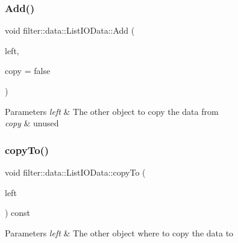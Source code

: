 \subsubsection{\texorpdfstring{Add()}{Add()}}
{\footnotesize\ttfamily void filter\+::data\+::\+List\+I\+O\+Data\+::\+Add (\begin{DoxyParamCaption}\item[{const \hyperlink{classfilter_1_1data_1_1_list_i_o_data}{List\+I\+O\+Data} \&}]{left,  }\item[{bool}]{copy = {\ttfamily false} }\end{DoxyParamCaption})\hspace{0.3cm}{\ttfamily [inline]}}


\begin{DoxyParams}{Parameters}
{\em left} & The other object to copy the data from \\
\hline
{\em copy} & unused \\
\hline
\end{DoxyParams}
\mbox{\label{classfilter_1_1data_1_1_list_i_o_data_a1e56236e33f0389b74ad287a209e0829}} 
\subsubsection{\texorpdfstring{copy\+To()}{copyTo()}}
{\footnotesize\ttfamily void filter\+::data\+::\+List\+I\+O\+Data\+::copy\+To (\begin{DoxyParamCaption}\item[{\hyperlink{classfilter_1_1data_1_1_list_i_o_data}{List\+I\+O\+Data} \&}]{left }\end{DoxyParamCaption}) const\hspace{0.3cm}{\ttfamily [inline]}}


\begin{DoxyParams}{Parameters}
{\em left} & The other object where to copy the data to \\
\hline
\end{DoxyParams}
\mbox{\label{classfilter_1_1data_1_1_list_i_o_data_ae0c60b47c1df28e014d85c56b2de283e}} 
